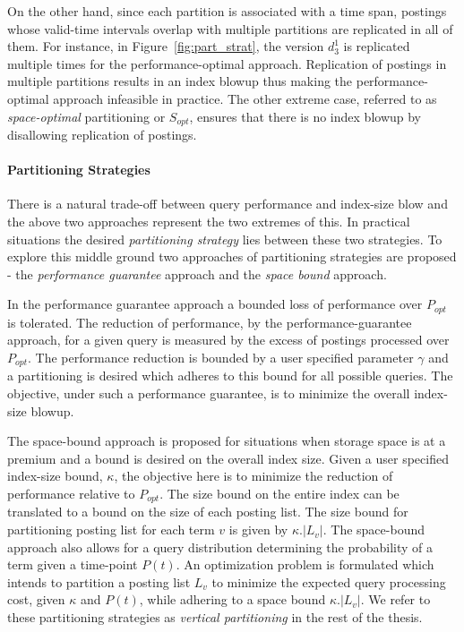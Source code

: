 On the other hand, since each partition is associated with a time span, postings whose valid-time intervals overlap with multiple partitions are replicated in all of them. For instance, in Figure~\ref{fig:part_strat}, the version $d_3^1$ is replicated multiple times for the performance-optimal approach. Replication of postings in multiple partitions results in an index blowup thus making the performance-optimal approach infeasible in practice. The other extreme case, referred to as \emph{space-optimal} partitioning or $S_{opt}$, ensures that there is no index blowup by disallowing replication of postings. 

\paragraph{Partitioning Strategies} There is a natural trade-off between query performance and index-size blow and the above two approaches represent the two extremes of this. In practical situations the desired \emph{partitioning strategy} lies between these two strategies. To explore this middle ground two approaches of partitioning strategies are proposed - the \emph{performance guarantee} approach and the \emph{space bound} approach.  

In the performance guarantee approach a bounded loss of performance over $P_{opt}$ is tolerated. The reduction of performance, by the performance-guarantee approach, for a given query is measured by the excess of postings processed over $P_{opt}$. The performance reduction is bounded by a user specified parameter $\gamma$ and a partitioning is desired which adheres to this bound for all possible queries. The objective, under such a performance guarantee, is to minimize the overall index-size blowup. 

The space-bound approach is proposed for situations when storage space is at a premium and a bound is desired on the overall index size. Given a user specified index-size bound, $\kappa$, the objective here is to  minimize the reduction of performance relative to $P_{opt}$. The size bound on the entire index can be translated to a bound on the size of each posting list. The size bound for partitioning posting list for each term $v$ is given by $\kappa.|L_v|$. The space-bound approach also allows for a query distribution determining the probability of a term given a time-point $P(t)$. An optimization problem is formulated which intends to partition a posting list $L_v$ to minimize the expected query processing cost, given $\kappa$ and $P(t)$, while adhering to a space bound $\kappa.|L_v|$. We refer to these partitioning strategies as \emph{vertical partitioning} in the rest of the thesis.


